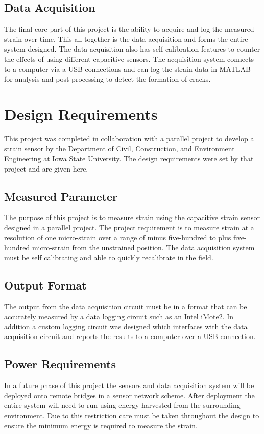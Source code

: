 \subsection{Data Acquisition}
The final core part of this project is the ability to acquire and log the measured strain over time.  This all together is the data acquisition and forms the entire system designed.  The data acquisition also has self calibration features to counter the effects of using different capacitive sensors.  The acquisition system connects to a computer via a USB connections and can log the strain data in MATLAB for analysis and post processing to detect the formation of cracks.


\section {Design Requirements}
This project was completed in collaboration with a parallel project to develop a strain sensor by the Department of Civil, Construction, and Environment Engineering at Iowa State University.  The design requirements were set by that project and are given here.

\subsection{Measured Parameter}
The purpose of this project is to measure strain using the capacitive strain sensor designed in a parallel project.  The project requirement is to measure strain at a resolution of one micro-strain over a range of minus five-hundred to plus five-hundred micro-strain from the unstrained position.  The data acquisition system must be self calibrating and able to quickly recalibrate in the field.

\subsection{Output Format}
The output from the data acquisition circuit must be in a format that can be accurately measured by a data logging circuit such as an Intel iMote2.  In addition a custom logging circuit was designed which interfaces with the data acquisition circuit and reports the results to a computer over a USB connection.   

\subsection{Power Requirements}
In a future phase of this project the sensors and data acquisition system will be deployed onto remote bridges in a sensor network scheme.  After deployment the entire system will need to run using energy harvested from the surrounding environment.  Due to this restriction care must be taken throughout the design to ensure the minimum energy is required to measure the strain.


